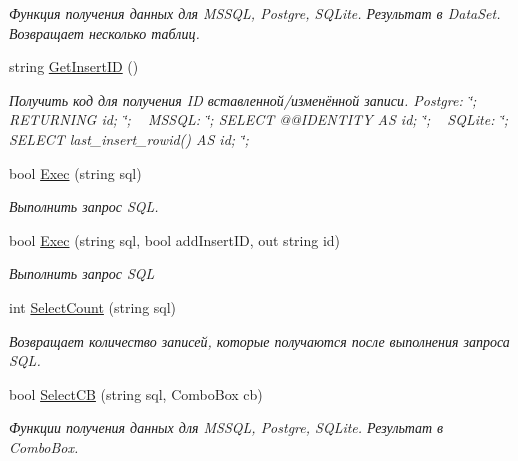 \begin{DoxyCompactItemize}
\begin{DoxyCompactList}\small\item\em Функция получения данных для M\+S\+S\+QL, Postgre, S\+Q\+Lite. Результат в Data\+Set. Возвращает несколько таблиц. \end{DoxyCompactList}\item 
string \mbox{\hyperlink{class_f_b_a_1_1_connection_a167e00898afa701230592d060c6d2e2c}{Get\+Insert\+ID}} ()
\begin{DoxyCompactList}\small\item\em Получить код для получения ID вставленной/изменённой записи. Postgre\+: \char`\"{}; R\+E\+T\+U\+R\+N\+I\+N\+G id; \char`\"{}; ~\newline
M\+S\+S\+QL\+: \char`\"{}; S\+E\+L\+E\+C\+T @@\+I\+D\+E\+N\+T\+I\+T\+Y A\+S id; \char`\"{}; ~\newline
S\+Q\+Lite\+: \char`\"{}; S\+E\+L\+E\+C\+T last\+\_\+insert\+\_\+rowid() A\+S id; \char`\"{}; \end{DoxyCompactList}\item 
bool \mbox{\hyperlink{class_f_b_a_1_1_connection_aad46a834def484b00f7930ca4ec880be}{Exec}} (string sql)
\begin{DoxyCompactList}\small\item\em Выполнить запрос S\+QL. \end{DoxyCompactList}\item 
bool \mbox{\hyperlink{class_f_b_a_1_1_connection_aa58e35746bf7d3176e982770ae60c83e}{Exec}} (string sql, bool add\+Insert\+ID, out string id)
\begin{DoxyCompactList}\small\item\em Выполнить запрос S\+QL \end{DoxyCompactList}\item 
int \mbox{\hyperlink{class_f_b_a_1_1_connection_a832beb0a31c62baefdb724e94537e97c}{Select\+Count}} (string sql)
\begin{DoxyCompactList}\small\item\em Возвращает количество записей, которые получаются после выполнения запроса S\+QL. \end{DoxyCompactList}\item 
bool \mbox{\hyperlink{class_f_b_a_1_1_connection_ab06c1ddb28525efd92457b44392378c4}{Select\+CB}} (string sql, Combo\+Box cb)
\begin{DoxyCompactList}\small\item\em Функции получения данных для M\+S\+S\+QL, Postgre, S\+Q\+Lite. Результат в Combo\+Box. \end{DoxyCompactList}\item 

\end{DoxyCompactItemize}
